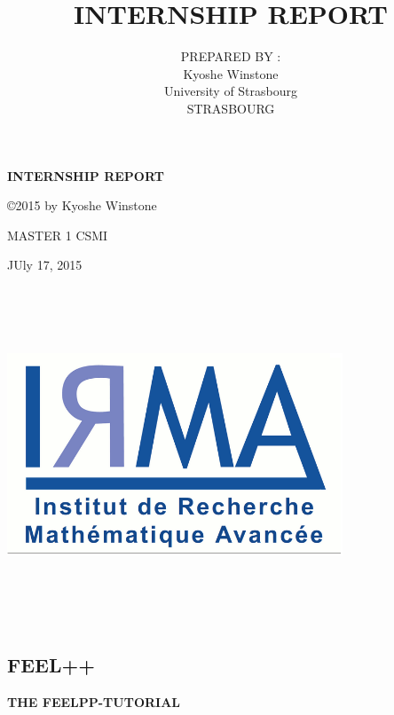 \documentclass[11pt,utf8]{article}
\title{INTERNSHIP REPORT}
\author{PREPARED BY :\\ Kyoshe Winstone\\University of Strasbourg\\STRASBOURG}
\begin{document}
\begin{center}
\textbf{{\large INTERNSHIP REPORT} }\\ %
\end{center}
\begin{center}
\copyright 2015 by Kyoshe Winstone \\
\end{center}

\begin{center}
MASTER 1 CSMI\\
\end{center}
\begin{center}
JUly 17, 2015

\end{center}
\begin{center}
 \includegraphics[width=10cm,height=10cm]{p1}
 \end{center}
 \begin{center}
 
\section*{FEEL++  }
\begin{center}
\textbf{{\large  THE FEELPP-TUTORIAL} }\\ %
   \end{center}
\label{weekly report of the internship}

\end{center}
\newpage
\end{document}
